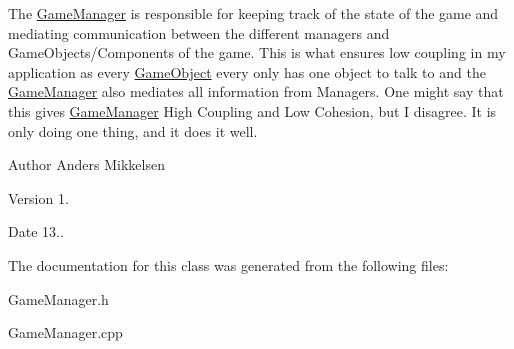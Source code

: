 The \hyperlink{class_game_manager}{Game\+Manager} is responsible for keeping track of the state of the game and mediating communication between the different managers and Game\+Objects/\+Components of the game. This is what ensures low coupling in my application as every \hyperlink{class_game_object}{Game\+Object} every only has one object to talk to and the \hyperlink{class_game_manager}{Game\+Manager} also mediates all information from Managers. One might say that this gives \hyperlink{class_game_manager}{Game\+Manager} High Coupling and Low Cohesion, but I disagree. It is only doing one thing, and it does it well.

\begin{DoxyAuthor}{Author}
Anders Mikkelsen 
\end{DoxyAuthor}
\begin{DoxyVersion}{Version}
1. 
\end{DoxyVersion}
\begin{DoxyDate}{Date}
13.. 
\end{DoxyDate}


The documentation for this class was generated from the following files\+:\begin{DoxyCompactItemize}
\item 
Game\+Manager.\+h\item 
Game\+Manager.\+cpp\end{DoxyCompactItemize}
